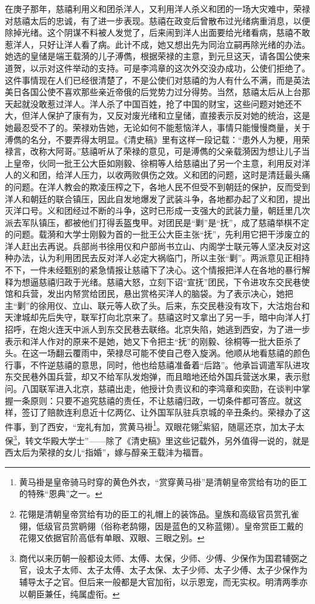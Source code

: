   在庚子那年，慈禧利用义和团杀洋人，又利用洋人杀义和团的一场大灾难中，荣禄对慈禧太后的忠诚，有了进一步表现。慈禧在政变后曾散布过光绪病重消息，以便除掉光绪。这个阴谋不料被人发觉了，后来闹到洋人出面要给光绪看病，慈禧不敢惹洋人，只好让洋人看了病。此计不成，她又想出先为同治立嗣再除光绪的办法。她选的皇储是端王载漪的儿子溥儁，根据荣禄的主意，到元旦这天，请各国公使来道贺，以示对这件举动的支持。可是李鸿章的这次外交没办成功，公使们拒绝了。这件事情现在人们已经很清楚了，不是公使们对慈禧的为人有什么不满，而是英法美日各国公使不喜欢那些亲近帝俄的后党势力过分得势。当然，慈禧太后从上台那天起就没敢惹过洋人。洋人杀了中国百姓，抢了中国的财宝，这些问题对她还不大，但洋人保护了康有为，又反对废光绪和立皇储，直接表示反对她的统治，这是她最忍受不了的。荣禄劝告她，无论如何不能惹恼洋人，事情只能慢慢商量，关于溥儁的名分，不要弄得太明显。《清史稿》里有这样一段记载：“患外人为梗，用荣禄言，改称大阿哥。”慈禧听从了荣禄的意见，可是溥儁的父亲载漪因为想让儿子当上皇帝，伙同一批王公大臣如刚毅、徐桐等人给慈禧出了另一个主意，利用反对洋人的义和团，给洋人压力，以收两败俱伤之效。义和团的问题，这时是清廷最头痛的问题。在洋人教会的欺凌压榨之下，各地人民不但受不到朝廷的保护，反而受到洋人和朝廷的联合镇压，因此自发地爆发了武装斗争，各地都办起了义和团，提出灭洋口号。义和团经过不断的斗争，这时已形成一支强大的武装力量，朝廷里几次派去军队镇压，都被他们打得丢盔曳甲。对团民是“剿”是“抚”，成了慈禧举棋不定的问题。载漪和大学士刚毅为首的一批王公大臣主张“抚”，先利用它把干涉废立的洋人赶出去再说。兵部尚书徐用仪和户部尚书立山、内阁学士联元等人坚决反对这种办法，认为利用团民去反对洋人必定大祸临门，所以主张“剿”。两派意见正相持不下，一件未经甄别的紧急情报让慈禧下了决心。这个情报把洋人在各地的暴行解释为想逼慈禧归政于光绪。慈禧大怒，立刻下诏“宣抚”团民，下令进攻东交民巷使馆和兵营，发出内帑赏给团民，悬出赏格买洋人的脑袋。为了表示决心，她把主“剿”的徐用仪、立山、联元等人砍了头。后来，东交民巷没有攻下，大沽炮台和天津城却先后失守，联军打向北京来了。慈禧这时又拿出了另一手，暗中向洋人打招呼，在炮火连天中派人到东交民巷去联络。北京失陷，她逃到西安，为了进一步表示和洋人作对的原来不是她，她又下令把主“抚”的刚毅、徐桐等一批大臣杀了头。在这一场翻云覆雨中，荣禄尽可能不使自己卷入旋涡。他顺从地看慈禧的颜色行事，不忤逆慈禧的意思，同时，他也给慈禧准备着“后路”。他承旨调遣军队进攻东交民巷外国兵营，却又不给军队发炮弹，而且暗地还给外国兵营送水果，表示慰问。八国联军进入北京，慈禧出走，他授计负责议和的李鸿章和奕劻，在谈判中掌握一条原则：只要不追究慈禧的责任，不让慈禧归政，一切条件都可答应。就这样，签订了赔款连利息近十亿两亿、让外国军队驻兵京城的辛丑条约。荣禄办了这件事，到了西安，“宠礼有加，赏黄马褂\footnote{黄马褂是皇帝骑马时穿的黄色外衣，“赏穿黄马褂”是清朝皇帝赏给有功的臣工的特殊“恩典”之一。}。双眼花翎\footnote{花翎是清朝皇帝赏给有功的臣工的礼帽上的装饰品。皇族和高级官员赏孔雀翎，低级官员赏鹖翎（俗称老鸹翎，因是蓝色的又称蓝翎）。皇帝赏臣工戴的花翎又依据官阶高低有单眼、双眼、三眼之别。}紫貂，随扈还京，加太子太保\footnote{商代以来历朝一般都设太师、太傅、太保，少师、少傅、少保作为国君辅弼之官，设太子太师、太子太傅、太子太保、太子少师、太子少傅、太子少保作为辅导太子之官。但后来一般都是大官加衔，以示恩宠，而无实权。明清两季亦以朝臣兼任，纯属虚衔。}，转文华殿大学士”——除了《清史稿》里这些记载外，另外值得一说的，就是西太后为荣禄的女儿“指婚”，嫁与醇亲王载沣为福晋。\\

